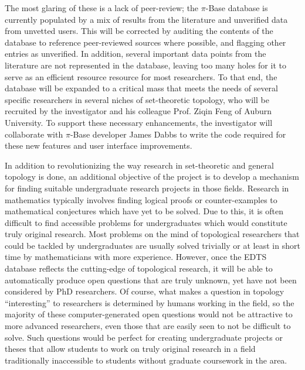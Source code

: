 \documentclass[11pt]{article}
\begin{document}
The most glaring of these is a lack of
peer-review; the \(\pi\)-Base database is currently populated by a mix of
results from
the literature and unverified data from unvetted users. This will be
corrected by auditing the contents of the database to reference peer-reviewed
sources where possible, and flagging other entries as unverified.
In addition, several important data points from the literature are not
represented in the database, leaving too many holes for it to serve as
an efficient resource resource for most researchers.
To that end, the database will be expanded to a critical mass that meets the
needs of several specific researchers in several niches of set-theoretic
topology, who will be recruited by the investigator and his colleague Prof.
Ziqin Feng of Auburn University. To support these necessary enhancements,
the investigator will collaborate with \(\pi\)-Base developer James Dabbs to
write the code required for these new features and user interface improvements.

In addition to revolutionizing the way research in set-theoretic and general
topology is done, an additional objective of the project is to develop
a mechanism for finding suitable undergraduate research projects in those
fields. Research in mathematics typically involves finding logical proofs or
counter-examples to mathematical conjectures which have yet to be solved. Due
to this, it is often difficult to find
accessible problems for undergraduates which would constitute
truly original research. Most problems on the mind of topological researchers
that could be tackled by undergraduates
are usually solved trivially or at least in short time by mathematicians with
more experience. However, once the EDTS database reflects the cutting-edge
of topological research, it will be able to
automatically produce open questions that are
truly unknown, yet have not been considered by PhD researchers. Of course,
what makes a question in topology ``interesting'' to researchers is determined
by humans working in the field, so the majority of these
computer-generated open questions
would not be attractive to more advanced researchers, even those that are
easily seen to not be difficult to solve. Such questions
would be perfect for
creating undergraduate projects or theses that allow students to work on
truly original research in a field traditionally inaccessible to students
without graduate coursework in the area.
\end{document}
